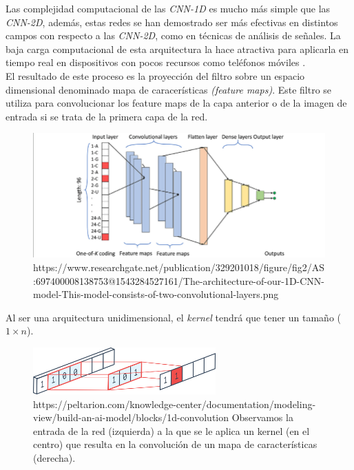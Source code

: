                 Las complejidad computacional de las \textit{CNN-1D} es mucho más simple que las \textit{CNN-2D}, además, estas redes se han demostrado ser más efectivas en distintos campos con respecto a las \textit{CNN-2D}, como en técnicas de análisis de señales. La baja carga computacional de esta arquitectura la hace atractiva para aplicarla en tiempo real en dispositivos con pocos recursos como teléfonos móviles \cite{Conv1D_Survey}.\\


                El resultado de este proceso es la proyección del filtro sobre un espacio dimensional denominado mapa de caracerísticas \textit{(feature maps)}. Este filtro se utiliza para convolucionar los feature maps de la capa anterior \cite{FiltersFeatureMaps} o de la imagen de entrada si se trata de la primera capa de la red.
                

                \begin{figure}[h]
                    \centering
                    \includegraphics[width=15cm]{archivos/CNN/1D/1CNNArchImage}
                    \caption{https://www.researchgate.net/publication/329201018/figure/fig2/AS:697400008138753@1543284527161/The-architecture-of-our-1D-CNN-model-This-model-consists-of-two-convolutional-layers.png}
                    \label{1CNNArchImage}
                \end{figure}


                Al ser una arquitectura unidimensional, el \textit{kernel} tendrá que tener un tamaño ($1 \times n$).

                \begin{figure}[h]
                    \centering
                    \includegraphics[width=7cm]{archivos/CNN/1D/1DConvolution}
                    \caption{https://peltarion.com/knowledge-center/documentation/modeling-view/build-an-ai-model/blocks/1d-convolution Observamos la entrada de la red (izquierda) a la que se le aplica un kernel (en el centro) que resulta en la convolución de un mapa de características (derecha).}
                    \label{1DConvolutionImage}
                \end{figure}

